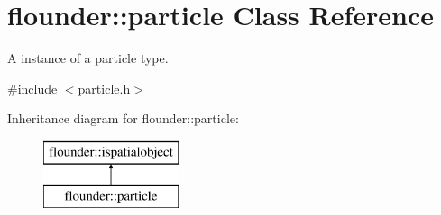 \hypertarget{classflounder_1_1particle}{}\section{flounder\+:\+:particle Class Reference}
\label{classflounder_1_1particle}


A instance of a particle type.  




{\ttfamily \#include $<$particle.\+h$>$}

Inheritance diagram for flounder\+:\+:particle\+:\begin{figure}[H]
\begin{center}
\leavevmode
\includegraphics[height=2.000000cm]{classflounder_1_1particle}
\end{center}
\end{figure}
